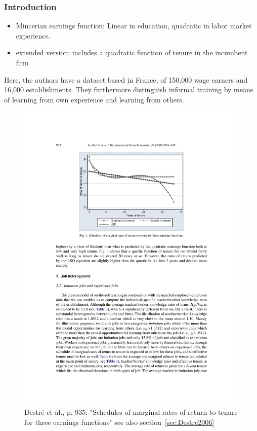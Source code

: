 \documentclass[12pt,a4paper]{article}
\begin{document}
  \subsubsection{Introduction} %
  \label{ssub:Introduction}
  \begin{itemize}
    \item Mincerian earnings function: Linear in education, quadratic in labor market experience.
    \item extended version: includes a quadratic function of tenure in the incumbent firm
  \end{itemize}
  Here, the authors have a dataset based in France, of 150,000 wage earners and 16,000
  establishments. They furthermore distinguish informal training by means of learning from own
  experience and learning from others.
  
    \begin{figure}[htb]
      \centering
      \includegraphics[width=12cm]{Meeting 4 LEARNING FROM EXPERIENCE - Seite 932.pdf}
      \caption{Destré et al., p. 935: "Schedules of marginal rates of return to tenure for three earnings functions" see also section~\ref{sec:Destre2006}}
      \label{fig:Destré marginalreturntotenureearningfunction}
    \end{figure}
\end{document}
